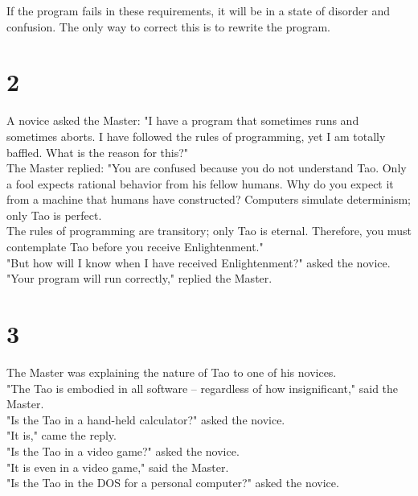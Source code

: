 \documentclass[14pt, letterpaper]{book}
\begin{document}
If the program fails in these requirements, it will be in a state of disorder and confusion. The only way to correct this is to rewrite the program.\\

\section*{2}
A novice asked the Master: "I have a program that sometimes runs and sometimes aborts. I have followed the rules of programming, yet I am totally baffled. What is the reason for this?"\\

The Master replied: "You are confused because you do not understand Tao. Only a fool expects rational behavior from his fellow humans. Why do you expect it from a machine that humans have constructed? Computers simulate determinism; only Tao is perfect.\\

The rules of programming are transitory; only Tao is eternal. Therefore, you must contemplate Tao before you receive Enlightenment."\\

"But how will I know when I have received Enlightenment?" asked the novice.\\

"Your program will run correctly," replied the Master.\\

\section*{3}
The Master was explaining the nature of Tao to one of his novices.\\

"The Tao is embodied in all software -- regardless of how insignificant," said the Master.\\

"Is the Tao in a hand-held calculator?" asked the novice.\\

"It is," came the reply.\\

"Is the Tao in a video game?" asked the novice.\\

"It is even in a video game," said the Master.\\

"Is the Tao in the DOS for a personal computer?" asked the novice.\\
\end{document}
